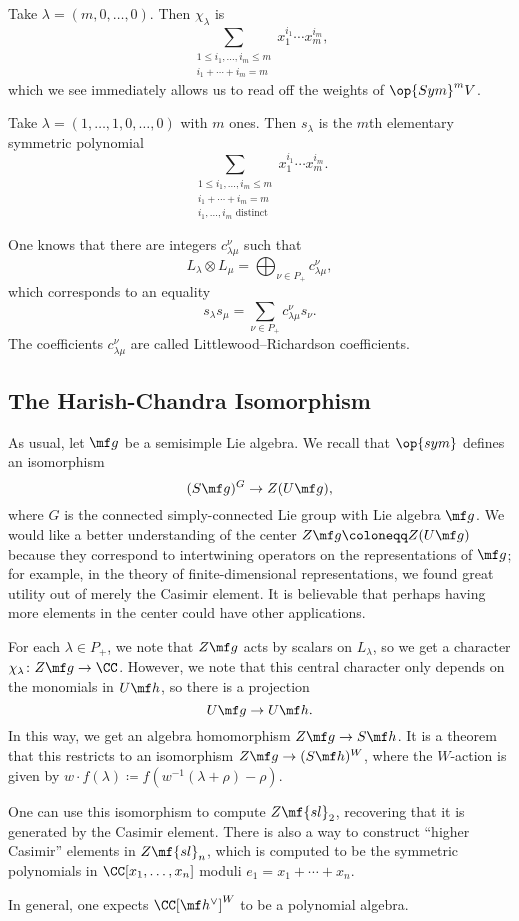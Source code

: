 \documentclass[../notes.tex]{subfiles}
\begin{document}
\begin{example}
	Take $\lambda=(m,0,\ldots,0)$. Then $\chi_\lambda$ is
	\[\sum_{\substack{1\le i_1,\ldots,i_m\le m\\i_1+\cdots+i_m=m}}x_1^{i_1}\cdots x_m^{i_m},\]
	which we see immediately allows us to read off the weights of $\op{Sym}^mV$.
\end{example}
\begin{example}
	Take $\lambda=(1,\ldots,1,0,\ldots,0)$ with $m$ ones. Then $s_\lambda$ is the $m$th elementary symmetric polynomial
	\[\sum_{\substack{1\le i_1,\ldots,i_m\le m\\i_1+\cdots+i_m=m\\i_1,\ldots,i_m\text{ distinct}}}x_1^{i_1}\cdots x_m^{i_m}.\]
\end{example}
\begin{remark}
	One knows that there are integers $c_{\lambda\mu}^\nu$ such that
	\[L_\lambda\otimes L_\mu=\bigoplus_{\nu\in P_+}c_{\lambda\mu}^\nu,\]
	which corresponds to an equality
	\[s_\lambda s_\mu=\sum_{\nu\in P_+}c_{\lambda\mu}^\nu s_\nu.\]
	The coefficients $c_{\lambda\mu}^\nu$ are called Littlewood--Richardson coefficients.
\end{remark}

\subsection{The Harish-Chandra Isomorphism}
As usual, let $\mf g$ be a semisimple Lie algebra. We recall that $\op{sym}$ defines an isomorphism
\[(S\mf g)^G\to Z(U\mf g),\]
where $G$ is the connected simply-connected Lie group with Lie algebra $\mf g$. We would like a better understanding of the center $Z\mf g\coloneqq Z(U\mf g)$ because they correspond to intertwining operators on the representations of $\mf g$; for example, in the theory of finite-dimensional representations, we found great utility out of merely the Casimir element. It is believable that perhaps having more elements in the center could have other applications.

For each $\lambda\in P_+$, we note that $Z\mf g$ acts by scalars on $L_\lambda$, so we get a character $\chi_\lambda\colon Z\mf g\to\CC$. However, we note that this central character only depends on the monomials in $U\mf h$, so there is a projection
\[U\mf g\to U\mf h.\]
In this way, we get an algebra homomorphism $Z\mf g\to S\mf h$. It is a theorem that this restricts to an isomorphism $Z\mf g\to(S\mf h)^W$, where the $W$-action is given by $w\cdot f(\lambda)\coloneqq f\left(w^{-1}(\lambda+\rho)-\rho\right)$.
\begin{example}
	One can use this isomorphism to compute $Z\mf{sl}_2$, recovering that it is generated by the Casimir element. There is also a way to construct ``higher Casimir'' elements in $Z\mf{sl}_n$, which is computed to be the symmetric polynomials in $\CC[x_1,\ldots,x_n]$ moduli $e_1=x_1+\cdots+x_n$.
\end{example}
\begin{remark}
	In general, one expects $\CC[\mf h^\lor]^W$ to be a polynomial algebra.
\end{remark}
\end{document}
